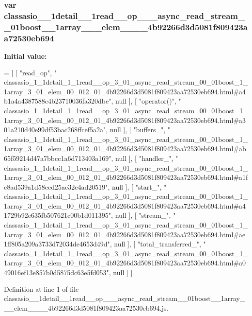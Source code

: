\subsubsection[{classasio\+\_\+1\+\_\+1detail\+\_\+1\+\_\+1read\+\_\+\+\_\+op\+\_\+3\+\_\+01\+\_\+async\+\_\+read\+\_\+stream\+\_\+00\+\_\+01boost\+\_\+1\+\_\+1array\+\_\+3\+\_\+01\+\_\+elem\+\_\+00\+\_\+012\+\_\+01\+\_\+4b92266d3d5081f809423aa72530eb694}]{\setlength{\rightskip}{0pt plus 5cm}var classasio\+\_\+\_\+1detail\+\_\+\_\+1read\+\_\+\+\_\+op\+\_\+\_\+\_\+async\+\_\+read\+\_\+stream\+\_\+\_\+01boost\+\_\+\_\+1array\+\_\+\_\+\_\+elem\+\_\+\_\+\_\+\_\+4b92266d3d5081f809423aa72530eb694}\label{classasio__1__1detail__1__1read____op__3__01__async__read__stream__00__01boost__1__1array__3__01969bee7580e764758ac65e6c12d4de70_a6bba6a1e7cfd9c5b45054d538205b2fc}
{\bfseries Initial value\+:}
\begin{DoxyCode}
=
[
    [ \textcolor{stringliteral}{"read\_op"}, \textcolor{stringliteral}{"
      classasio\_1\_1detail\_1\_1read\_\_op\_3\_01\_async\_read\_stream\_00\_01boost\_1\_1array\_3\_01\_elem\_00\_012\_01\_4b92266d3d5081f809423aa72530eb694.html#a4b1a4a4387588c4b23710036fa320dbe"}, null ],
    [ \textcolor{stringliteral}{"operator()"}, \textcolor{stringliteral}{"
      classasio\_1\_1detail\_1\_1read\_\_op\_3\_01\_async\_read\_stream\_00\_01boost\_1\_1array\_3\_01\_elem\_00\_012\_01\_4b92266d3d5081f809423aa72530eb694.html#a301a210d40e99df53bac268ffcef5a2a"}, null ],
    [ \textcolor{stringliteral}{"buffers\_"}, \textcolor{stringliteral}{"
      classasio\_1\_1detail\_1\_1read\_\_op\_3\_01\_async\_read\_stream\_00\_01boost\_1\_1array\_3\_01\_elem\_00\_012\_01\_4b92266d3d5081f809423aa72530eb694.html#ab65f59214d47a7bbcc1a6d713403a169"}, null ],
    [ \textcolor{stringliteral}{"handler\_"}, \textcolor{stringliteral}{"
      classasio\_1\_1detail\_1\_1read\_\_op\_3\_01\_async\_read\_stream\_00\_01boost\_1\_1array\_3\_01\_elem\_00\_012\_01\_4b92266d3d5081f809423aa72530eb694.html#a1fc8ad539a1d58ecd25ac32e4ad20519"}, null ],
    [ \textcolor{stringliteral}{"start\_"}, \textcolor{stringliteral}{"
      classasio\_1\_1detail\_1\_1read\_\_op\_3\_01\_async\_read\_stream\_00\_01boost\_1\_1array\_3\_01\_elem\_00\_012\_01\_4b92266d3d5081f809423aa72530eb694.html#a41729b92e635fb507621c00b1d011395"}, null ],
    [ \textcolor{stringliteral}{"stream\_"}, \textcolor{stringliteral}{"
      classasio\_1\_1detail\_1\_1read\_\_op\_3\_01\_async\_read\_stream\_00\_01boost\_1\_1array\_3\_01\_elem\_00\_012\_01\_4b92266d3d5081f809423aa72530eb694.html#ae1ff805a209a3733d72034de4653d49d"}, null ],
    [ \textcolor{stringliteral}{"total\_transferred\_"}, \textcolor{stringliteral}{"
      classasio\_1\_1detail\_1\_1read\_\_op\_3\_01\_async\_read\_stream\_00\_01boost\_1\_1array\_3\_01\_elem\_00\_012\_01\_4b92266d3d5081f809423aa72530eb694.html#a049016ef13e857b0d5875dc63e5fd053"}, null ]
]
\end{DoxyCode}


Definition at line 1 of file classasio\+\_\+\_\+1detail\+\_\+\_\+1read\+\_\+\+\_\+op\+\_\+\_\+\_\+async\+\_\+read\+\_\+stream\+\_\+\_\+01boost\+\_\+\_\+1array\+\_\+\_\+\_\+elem\+\_\+\_\+\_\+\_\+4b92266d3d5081f809423aa72530eb694.\+js.

